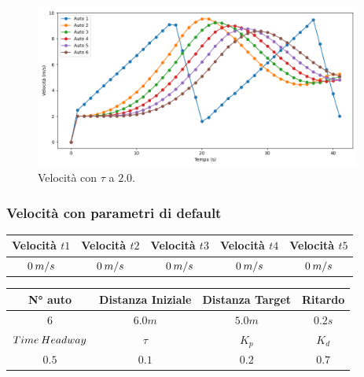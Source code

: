 \begin{figure}[H]
    \includegraphics[width=0.96\textwidth]{images/5-experiment/tau/velocity_2.png}
    \caption{Velocità con $\tau$ a $2.0$.}
    \label{fig:2-tau-velocity}
\end{figure}
\vspace*{\fill}
\newpage



\subsubsection{Velocità con parametri di default}

\begin{table}[h]
    \centering
    \begin{tabular}{|c|c|c|c|c|}
        \hline
        Velocità $t1$ & Velocità $t2$ & Velocità $t3$ &Velocità $t4$ &Velocità $t5$\\
        \hline
            $0\hspace{0.2em}m/s$ & $0\hspace{0.2em}m/s$ & $0\hspace{0.2em}m/s$ & $0\hspace{0.2em}m/s$ & $0\hspace{0.2em}m/s$ \\
        \hline
    \end{tabular}
\end{table}
\begin{table}[h]
    \centering
    \begin{tabular}{|c|c|c|c|}
        \hline
        N° auto & Distanza Iniziale & Distanza Target & Ritardo \\
        \hline
        $6$ & $6.0 m$ & $5.0 m$ & $0.2 s$ \\
        \hline
        $Time\hspace{0.2em}Headway$ & $\tau$ & $K_p$ & $K_d$  \\
        \hline
        $0.5$ & $0.1$ & $0.2$ & $0.7$ \\
        \hline
    \end{tabular}
\end{table}

